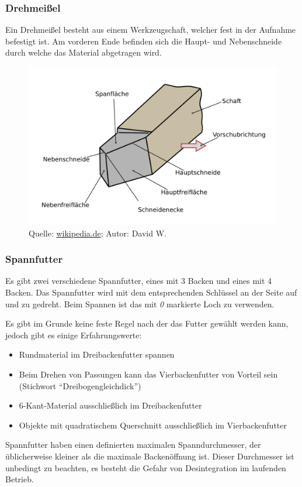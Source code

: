 \documentclass{\basedir/fablab-document}
\begin{document}
\newpage
\subsubsection{Drehmeißel}
Ein Drehmeißel besteht aus einem Werkzeugschaft, welcher fest in der Aufnahme befestigt ist. Am vorderen Ende befinden sich die Haupt- und Nebenschneide durch welche das Material
abgetragen wird.
\begin{figure}[ht]
\centering
\includegraphics[width = 0.75\linewidth]{img/drehmeissel}
\caption{Quelle: \href{http://commons.wikimedia.org/wiki/File:Flaechen_am_Schneidkeil.svg}{wikipedia.de}; Autor: David W.}
\end{figure}

\subsubsection{Spannfutter}

Es gibt zwei verschiedene Spannfutter, eines mit 3 Backen und eines mit 4 Backen. Das Spannfutter wird mit dem entsprechenden Schlüssel an der Seite auf und zu gedreht. Beim Spannen ist das mit \emph{0} markierte Loch zu verwenden.

Es gibt im Grunde keine feste Regel nach der das Futter gewählt werden kann, jedoch gibt es einige Erfahrungswerte:
\begin{itemize} 
\item Rundmaterial im Dreibackenfutter spannen
\item Beim Drehen von Passungen kann das Vierbackenfutter von Vorteil sein (Stichwort \enquote{Dreibogengleichdick})
\item 6-Kant-Material ausschließlich im Dreibackenfutter
\item Objekte mit quadratischem Querschnitt ausschließlich im Vierbackenfutter
\end{itemize}

Spannfutter haben einen definierten maximalen Spanndurchmesser, der üblicherweise kleiner als die maximale Backenöffnung ist. Dieser Durchmesser ist unbedingt zu beachten, es besteht die Gefahr von Desintegration im laufenden Betrieb.
\end{document}
